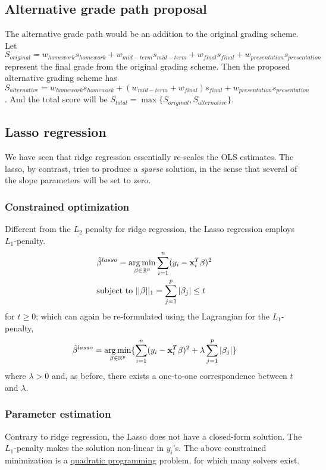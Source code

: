 \subsection*{Alternative grade path proposal}
The alternative grade path would be an addition to the original grading scheme.
Let $S_{original} = w_{homework} s_{homework} + w_{mid-term} s_{mid-term} + w_{final} s_{final} + w_{presentation} s_{presentation} $ represent the final grade from the original grading scheme.
Then the proposed alternative grading scheme has $S_{alternative} = w_{homework} s_{homework} + (w_{mid-term} + w_{final}) s_{final} + w_{presentation} s_{presentation} $.
And the total score will be $S_{total} = \max\{S_{original}, S_{alternative} \}$.


\subsection*{Lasso regression}
We have seen that ridge regression essentially re-scales the OLS estimates.
The lasso, by contrast, tries to produce a {\it sparse} solution, in the sense that several of the slope parameters will be set to zero.

\subsubsection*{Constrained optimization}
Different from the $L_2$ penalty for ridge regression, the Lasso regression employs $L_1$-penalty.
$$
\begin{aligned}
	&\hat{\beta}^{lasso} = \operatorname*{arg\,min}\limits_{\beta \in \mathbb{R}^p} \sum\limits_{i = 1}^n(y_i - \mathbf{x}_i^T \beta)^2\\
	&\mbox{subject to } ||\beta||_1 = \sum\limits_{j = 1}^p |\beta_j| \le t \\
\end{aligned}
$$
for $t \ge 0$; which can again be re-formulated using the Lagrangian for the $L_1$-penalty,
$$
\hat{\beta}^{lasso} =\operatorname*{arg\,min}\limits_{\beta \in \mathbb{R}^p} \{  \sum\limits_{i = 1}^n(y_i - \mathbf{x}_i^T \beta)^2 + \lambda \sum\limits_{j = 1}^p |\beta_j|\}
$$
where $\lambda > 0$ and, as before, there exists a one-to-one correspondence between $t$ and $\lambda$.

\subsubsection*{Parameter estimation}
Contrary to ridge regression, the Lasso does not have a closed-form solution.
The $L_1$-penalty makes the solution non-linear in $y_i$'s.
The above constrained minimization is a \underline{quadratic programming} problem, for which many solvers exist.

